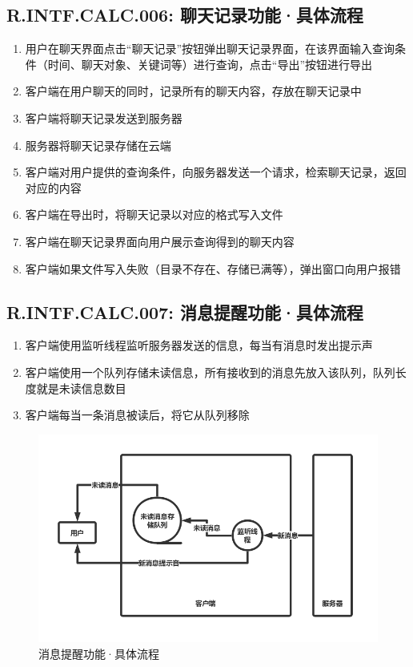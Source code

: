     \subsection{R.INTF.CALC.006: 聊天记录功能·具体流程}
    \begin{enumerate}
        \item 用户在聊天界面点击“聊天记录”按钮弹出聊天记录界面，在该界面输入查询条件（时间、聊天对象、关键词等）进行查询，点击“导出”按钮进行导出
        \item 客户端在用户聊天的同时，记录所有的聊天内容，存放在聊天记录中
        \item 客户端将聊天记录发送到服务器
        \item 服务器将聊天记录存储在云端
        \item 客户端对用户提供的查询条件，向服务器发送一个请求，检索聊天记录，返回对应的内容
        \item 客户端在导出时，将聊天记录以对应的格式写入文件
        \item 客户端在聊天记录界面向用户展示查询得到的聊天内容
        \item 客户端如果文件写入失败（目录不存在、存储已满等），弹出窗口向用户报错
    \end{enumerate}
    
    \subsection{R.INTF.CALC.007: 消息提醒功能·具体流程}
    \begin{enumerate}
        \item 客户端使用监听线程监听服务器发送的信息，每当有消息时发出提示声
        \item 客户端使用一个队列存储未读信息，所有接收到的消息先放入该队列，队列长度就是未读信息数目
        \item 客户端每当一条消息被读后，将它从队列移除
    \end{enumerate}
        \begin{figure}[h]
            \centering
            \includegraphics[scale=0.4]{OutlineDesign/figures/消息提醒功能·具体流程.png}
            \caption{消息提醒功能·具体流程}
            \label{fig:server_flow}
        \end{figure}
